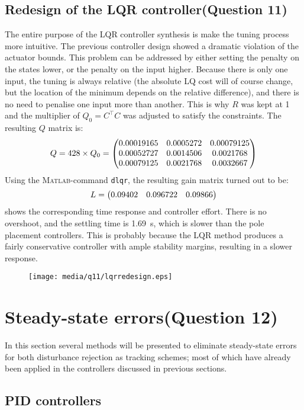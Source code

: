 \subsection{Redesign of the LQR controller\textnormal{\phantom{xxx}(Question 11)}}
\label{sec:retunelqr}
The entire purpose of the LQR controller synthesis is make the tuning process more intuitive. The previous controller design showed a dramatic violation of the actuator bounds. This problem can be addressed by either setting the penalty on the states lower, or the penalty on the input higher. Because there is only one input, the tuning is always relative (the absolute LQ cost will of course change, but the location of the minimum depends on the relative difference), and there is no need to penalise one input more than another. This is why $R$ was kept at 1 and the multiplier of $Q_0 = C^\top C$ was adjusted to satisfy the constraints. The resulting $Q$ matrix is:
$$ Q = 428\times Q_0 = \mqty(0.00019165 & 0.0005272 &  0.00079125\\
                             0.00052727 & 0.0014506 &  0.0021768\\
                             0.00079125 & 0.0021768 &  0.0032667\\) $$
Using the \textsc{Matlab}-command \texttt{dlqr}, the resulting gain matrix turned out to be:
 $$L = \mqty(0.09402 & 0.096722 & 0.09866)$$
 shows the corresponding time response and controller effort. There is no overshoot, and the settling time is \SI{1.69}{\second}, which is slower than the pole placement controllers. This is probably because the LQR method produces a fairly conservative controller with ample stability margins, resulting in a slower response.
\begin{figure}[ht]
    \centering
    \texttt{[image: media/q11/lqrredesign.eps]}
    \caption{}
    \label{fig:q11_lqrredesign}
\end{figure}

\clearpage
\section{Steady-state errors\textnormal{\phantom{xxx}(Question 12)}}
\label{sec:q12}
In this section several methods will be presented to eliminate steady-state errors for both disturbance rejection as tracking schemes; most of which have already been applied in the controllers discussed in previous sections. \cite{nise}
\subsection*{PID controllers}
